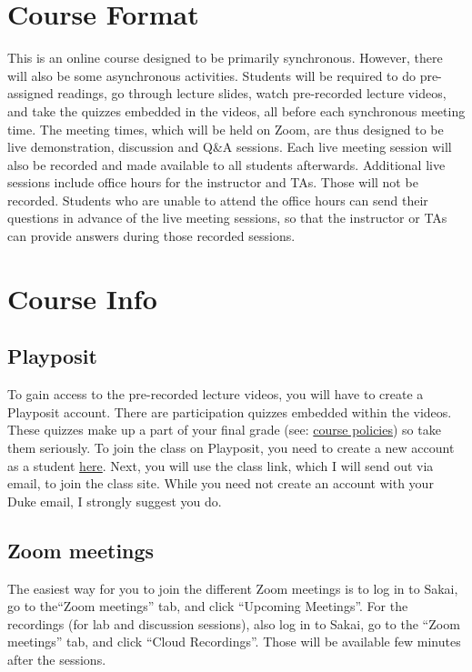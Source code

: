 \documentclass[11pt, a4paper]{article}
\begin{document}
\section{Course Format}
This is an online course designed to be primarily synchronous. However, there will also be some asynchronous activities. Students will be required to do pre-assigned readings, go through lecture slides, watch pre-recorded lecture videos, and take the quizzes embedded in the videos, all before each synchronous meeting time. The meeting times, which will be held on Zoom, are thus designed to be live demonstration, discussion and Q\&A sessions. Each live meeting session will also be recorded and made available to all students afterwards. Additional live sessions include office hours for the instructor and TAs. Those will not be recorded. Students who are unable to attend the office hours can send their questions in advance of the live meeting sessions, so that the instructor or TAs can provide answers during those recorded sessions.


\section{Course Info}
\subsection{Playposit}
To gain access to the pre-recorded lecture videos, you will have to create a Playposit account. There are participation quizzes embedded within the videos. These quizzes make up a part of your final grade (see: \href{https://sta-602l-s21.github.io/Course-Website/policies/}{course policies}) so take them seriously. To join the class on Playposit, you need to create a new account as a student \href{https://www.playposit.com/join}{here}. Next, you will use the class link, which I will send out via email, to join the class site. While you need not create an account with your Duke email, I strongly suggest you do.

\subsection{Zoom meetings}
The easiest way for you to join the different Zoom meetings is to log in to Sakai, go to the``Zoom meetings'' tab, and click ``Upcoming Meetings''. For the recordings (for lab and discussion sessions), also log in to Sakai, go to the ``Zoom meetings'' tab, and click ``Cloud Recordings''. Those will be available few minutes after the sessions.
\end{document}
